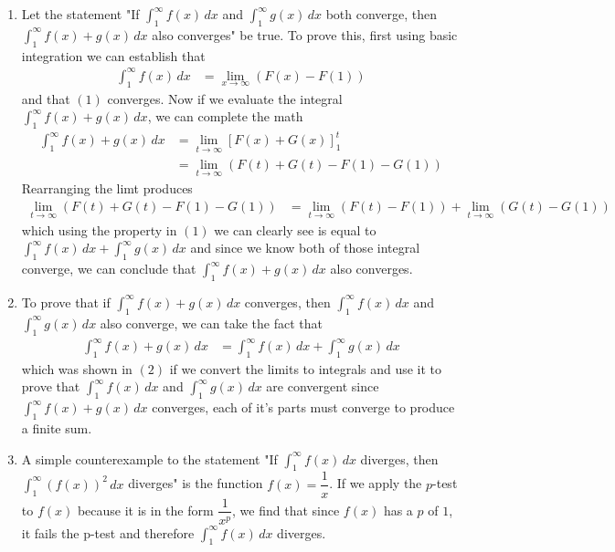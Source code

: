 \documentclass{article}
\begin{document}
\begin{enumerate}[label=\textbf{(6.\arabic*)}]
\begin{enumerate}
    \item Let the statement "If $\int_1^\infty\!f(x)\,dx$ and $\int_1^\infty\!g(x)\,dx$ both converge, then $\int_1^\infty\!f(x)+g(x)\,dx$ also converges" be true. To prove this, first using basic integration
    we can establish that
    \begin{align}
        \int_1^\infty\!f(x)\,dx &= \lim_{x\to\infty} \left(F(x)-F(1)\right)
    \end{align}
    and that $(1)$ converges. Now if we evaluate the integral $\int_1^\infty\!f(x)+g(x)\,dx$, we can complete the math
    \begin{align*}
        \int_1^\infty\!f(x)+g(x)\,dx &= \lim_{t\to\infty} \left[F(x)+G(x)\right]_1^t \\
        &= \lim_{t\to\infty}\left(F(t)+G(t)-F(1)-G(1)\right)
    \end{align*}
    Rearranging the limt produces 
    \begin{align}
        \lim_{t\to\infty}\left(F(t)+G(t)-F(1)-G(1)\right) &= \lim_{t\to\infty} \left(F(t)-F(1)\right)+\lim_{t\to\infty} \left(G(t)-G(1)\right)
    \end{align}
    which using the property in $(1)$ we can clearly see is equal to $\int_1^\infty\!f(x)\,dx + \int_1^\infty\!g(x)\,dx$ and since we know both of those integral converge, we can conclude that 
    $\int_1^\infty\!f(x)+g(x)\,dx$ also converges.
    \item To prove that if $\int_1^\infty\!f(x)+g(x)\,dx$ converges, then $\int_1^\infty\!f(x)\,dx$ and $\int_1^\infty\!g(x)\,dx$ also converge,
    we can take the fact that 
    \begin{align*}
        \int_1^\infty\!f(x)+g(x)\,dx &= \int_1^\infty\!f(x)\,dx + \int_1^\infty\!g(x)\,dx
    \end{align*}
    which was shown in $(2)$ if we convert the limits to integrals and use it to prove that $\int_1^\infty\!f(x)\,dx$ and $\int_1^\infty\!g(x)\,dx$ are convergent since $\int_1^\infty\!f(x)+g(x)\,dx$ converges, each of it's parts must converge
    to produce a finite sum.
    \item A simple counterexample to the statement "If $\int_1^\infty\!f(x)\,dx$ diverges, then $\int_1^\infty\!\left(f(x)\right)^2\,dx$ diverges" is the function $f(x)=\dfrac{1}{x}$. If we apply the $p$-test to $f(x)$ because it is in
    the form $\dfrac{1}{x^p}$, we find that since $f(x)$ has a $p$ of $1$, it fails the p-test and therefore $\int_1^\infty\!f(x)\,dx$ diverges. \\

\end{enumerate}
\end{enumerate}
\end{document}
